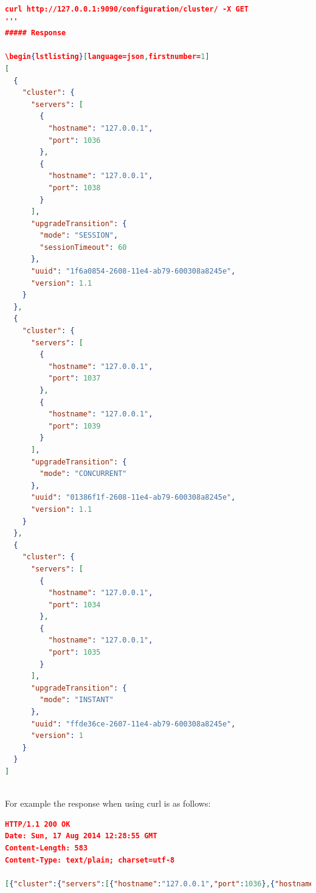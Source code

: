 \documentclass[a4paper,11pt,twoside]{article}
\begin{document}
\begin{lstlisting}[language=json,firstnumber=1]
curl http://127.0.0.1:9090/configuration/cluster/ -X GET
'''
##### Response

\begin{lstlisting}[language=json,firstnumber=1]
[
  {
    "cluster": {
      "servers": [
        {
          "hostname": "127.0.0.1", 
          "port": 1036
        }, 
        {
          "hostname": "127.0.0.1", 
          "port": 1038
        }
      ], 
      "upgradeTransition": {
        "mode": "SESSION", 
        "sessionTimeout": 60
      }, 
      "uuid": "1f6a0854-2608-11e4-ab79-600308a8245e", 
      "version": 1.1
    }
  }, 
  {
    "cluster": {
      "servers": [
        {
          "hostname": "127.0.0.1", 
          "port": 1037
        }, 
        {
          "hostname": "127.0.0.1", 
          "port": 1039
        }
      ], 
      "upgradeTransition": {
        "mode": "CONCURRENT"
      }, 
      "uuid": "01386f1f-2608-11e4-ab79-600308a8245e", 
      "version": 1.1
    }
  }, 
  {
    "cluster": {
      "servers": [
        {
          "hostname": "127.0.0.1", 
          "port": 1034
        }, 
        {
          "hostname": "127.0.0.1", 
          "port": 1035
        }
      ], 
      "upgradeTransition": {
        "mode": "INSTANT"
      }, 
      "uuid": "ffde36ce-2607-11e4-ab79-600308a8245e", 
      "version": 1
    }
  }
]
\end{lstlisting}

\noindent \\
For example the response when using curl is as follows:

\begin{lstlisting}[language=json,firstnumber=1]
HTTP/1.1 200 OK
Date: Sun, 17 Aug 2014 12:28:55 GMT
Content-Length: 583
Content-Type: text/plain; charset=utf-8
 
[{"cluster":{"servers":[{"hostname":"127.0.0.1","port":1036},{"hostname":"127.0.0.1","port":1038}],"upgradeTransition":{"mode":"SESSION","sessionTimeout":60},"uuid":"1f6a0854-2608-11e4-ab79-600308a8245e","version":1.1}},{"cluster":{"servers":[{"hostname":"127.0.0.1","port":1037},{"hostname":"127.0.0.1","port":1039}],"upgradeTransition":{"mode":"CONCURRENT"},"uuid":"01386f1f-2608-11e4-ab79-600308a8245e","version":1.1}},{"cluster":{"servers":[{"hostname":"127.0.0.1","port":1034},{"hostname":"127.0.0.1","port":1035}],"upgradeTransition":{"mode":"INSTANT"},"uuid":"ffde36ce-2607-11e4-ab79-600308a8245e","version":1}}]
\end{lstlisting}
\end{document}
